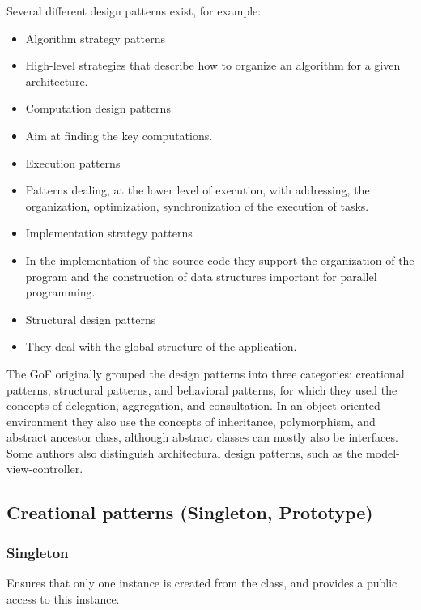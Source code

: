 \documentclass[margin=0px]{article}
\begin{document}
Several different design patterns exist, for example:
\begin{itemize}
    \item Algorithm strategy patterns
    \item High-level strategies that describe how to organize an algorithm for a given architecture.
    \item Computation design patterns
    \item Aim at finding the key computations.
    \item Execution patterns
    \item Patterns dealing, at the lower level of execution, with addressing, the organization, optimization, synchronization of the execution of tasks.
    \item Implementation strategy patterns
    \item In the implementation of the source code they support the organization of the program and the construction of data structures important for parallel programming.
    \item Structural design patterns
    \item They deal with the global structure of the application.
\end{itemize}

The GoF originally grouped the design patterns into three categories: creational patterns, structural patterns, and behavioral patterns, for which they used the concepts of delegation, aggregation, and consultation. In an object-oriented environment they also use the concepts of inheritance, polymorphism, and abstract ancestor class, although abstract classes can mostly also be interfaces. Some authors also distinguish architectural design patterns, such as the model-view-controller.

\subsection{Creational patterns (Singleton, Prototype)}

\subsubsection{Singleton}
Ensures that only one instance is created from the class, and provides a public access to this instance.
\end{document}
